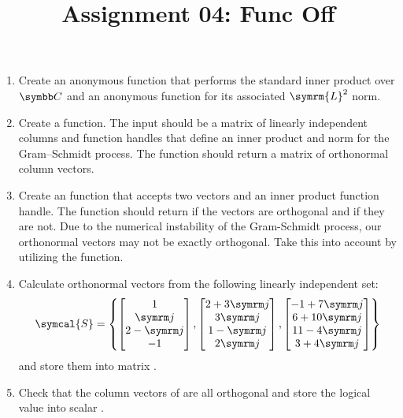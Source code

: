 \documentclass{article}
\title{Assignment 04: Func Off}
\begin{document}
\renderTitle

\begin{enumerate}[leftmargin=*]
	\item
		Create an  anonymous function that performs
		the standard inner product over \(\C\) and an
		 anonymous function for its associated
		\(\symrm{L}^2\) norm.

	\item
		Create a  function.  The input
		should be a matrix of linearly independent columns and
		function handles that define an inner product and norm
		for the Gram–Schmidt process.  The function should
		return a matrix of orthonormal column vectors.

	\item
		Create an  function that accepts
		two vectors and an inner product function handle.  The
		function should return  if the vectors
		are orthogonal and  if they are not.
		Due to the numerical instability of the Gram-Schmidt
		process, our orthonormal vectors may not be exactly
		orthogonal.  Take this into account by utilizing the
		 function.

	\item
		Calculate orthonormal vectors from the following
		linearly independent set:
		\begin{equation}
			\symcal{S}
			=
			\left\{
				\begin{bmatrix}
					1       \\
					\im     \\
					2 - \im \\
					-1      \\
				\end{bmatrix},
				\begin{bmatrix}
					2 + 3\im \\
					3\im     \\
					1 - \im  \\
					2\im     \\
				\end{bmatrix},
				\begin{bmatrix}
					-1 + 7\im \\
					6 + 10\im \\
					11 - 4\im \\
					3 + 4\im  \\
				\end{bmatrix}
			\right\}
		\end{equation}
		and store them into matrix .

	\item
		Check that the column vectors of  are all
		orthogonal and store the logical value into scalar
		.
\end{enumerate}
\end{document}
